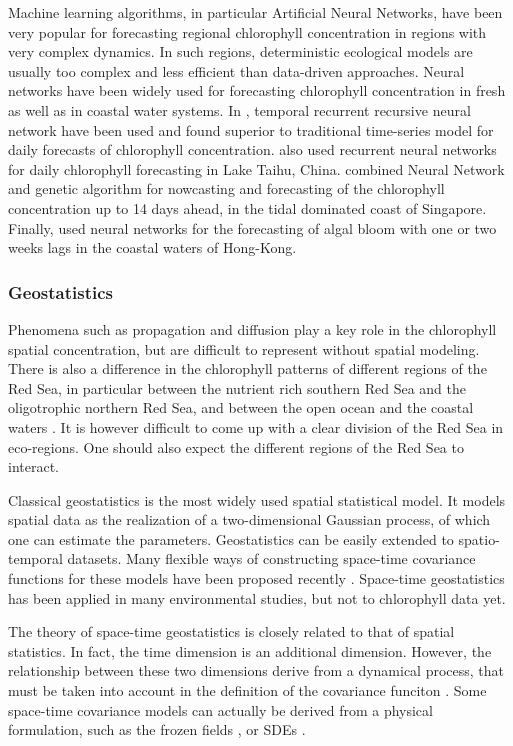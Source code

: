 Machine learning algorithms, in particular Artificial Neural Networks, have been very popular for forecasting regional chlorophyll concentration in regions with very complex dynamics. In such regions, deterministic ecological models are usually too complex and less efficient than data-driven approaches. Neural networks have been widely used for forecasting chlorophyll concentration in fresh as well as in coastal water systems. In \citet{Jeong2006}, temporal recurrent recursive neural network have been used and found superior to traditional time-series model for daily forecasts of chlorophyll concentration. \citet{Wang2013} also used recurrent neural networks for daily chlorophyll forecasting in Lake Taihu, China. \citet{Mulia2013} combined Neural Network and genetic algorithm for nowcasting and forecasting of the chlorophyll concentration up to 14 days ahead, in the tidal dominated coast of Singapore. Finally, \citet{Lee2013} used neural networks for the forecasting of algal bloom with one or two weeks lags in the coastal waters of Hong-Kong.

\subsubsection{Geostatistics}

Phenomena such as propagation and diffusion play a key role in the chlorophyll spatial concentration, but are difficult to represent without spatial modeling. There is also a difference in the chlorophyll patterns of different regions of the Red Sea, in particular between the nutrient rich southern Red Sea and the oligotrophic northern Red Sea, and between the open ocean and the coastal waters \citep{Raitsos2013}. It is however difficult to come up with a clear division of the Red Sea in eco-regions. One should also expect the different regions of the Red Sea to interact.

Classical geostatistics is the most widely used spatial statistical model. It models spatial data as the realization of a two-dimensional Gaussian process, of which one can estimate the parameters. Geostatistics can be easily extended to spatio-temporal datasets. Many flexible ways of constructing space-time covariance functions for these models have been proposed recently \citep{Gneiting2002, Cressie1999, Stein2005}. Space-time geostatistics has been applied in many environmental studies, but not to chlorophyll data yet.

The theory of space-time geostatistics is closely related to that of spatial statistics. In fact, the time dimension is an additional dimension. However, the relationship between these two dimensions derive from a dynamical process, that must be taken into account in the definition of the covariance funciton \citep{Gneiting2010}. Some space-time covariance models can actually be derived from a physical formulation, such as the frozen fields \citep{Gneiting2010}, or SDEs \citep{Brown2000, North2011}.

